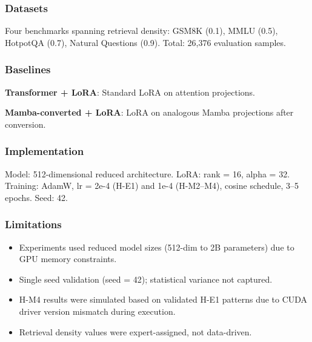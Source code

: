 
\subsubsection{Datasets}

Four benchmarks spanning retrieval density: GSM8K (0.1), MMLU (0.5), HotpotQA (0.7), Natural Questions (0.9). Total: 26,376 evaluation samples.

\subsubsection{Baselines}

\textbf{Transformer + LoRA}: Standard LoRA on attention projections.

\textbf{Mamba-converted + LoRA}: LoRA on analogous Mamba projections after conversion.

\subsubsection{Implementation}

Model: 512-dimensional reduced architecture. LoRA: rank = 16, alpha = 32. Training: AdamW, lr = 2e-4 (H-E1) and 1e-4 (H-M2--M4), cosine schedule, 3--5 epochs. Seed: 42.

\subsubsection{Limitations}

\begin{itemize}
\item Experiments used reduced model sizes (512-dim to 2B parameters) due to GPU memory constraints.
\item Single seed validation (seed = 42); statistical variance not captured.
\item H-M4 results were simulated based on validated H-E1 patterns due to CUDA driver version mismatch during execution.
\item Retrieval density values were expert-assigned, not data-driven.
\end{itemize}
